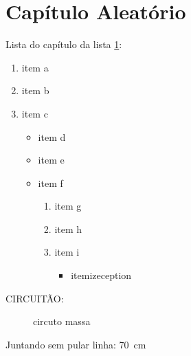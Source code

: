 \chapter{Capítulo Aleatório}
\label{chap:CapAle}

Lista do capítulo da lista \ref{chap:CapAle}:

\begin{enumerate}
\item item a
\item item b
\item item c
	\begin{itemize}
	\item item d
	\item item e
	\item item f
		\begin{enumerate}[label*=\arabic*.]
		\item item g
		\item item h
		\item item i
			\begin{itemize}
			\item itemizeception
			\end{itemize}
		\end{enumerate}
	\end{itemize}
\end{enumerate}

CIRCUITÃO:

\begin{figure}[!htb] \label{fig:circuitevers}
\centering
{}
\caption{circuto massa}
\end{figure}

Juntando sem pular linha: 70~cm 
\hfill

